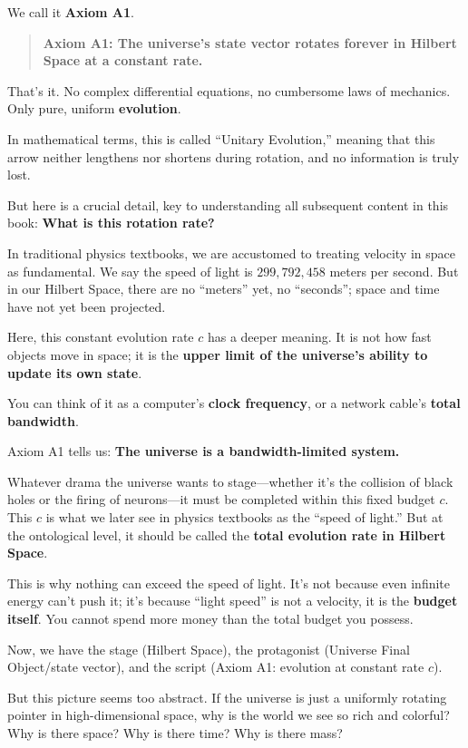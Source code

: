 We call it \textbf{Axiom A1}.

\begin{quote}
\textbf{Axiom A1: The universe's state vector rotates forever in Hilbert Space at a constant rate.}
\end{quote}

That's it. No complex differential equations, no cumbersome laws of mechanics. Only pure, uniform \textbf{evolution}.

In mathematical terms, this is called ``Unitary Evolution,'' meaning that this arrow neither lengthens nor shortens during rotation, and no information is truly lost.

But here is a crucial detail, key to understanding all subsequent content in this book: \textbf{What is this rotation rate?}

In traditional physics textbooks, we are accustomed to treating velocity in space as fundamental. We say the speed of light is $299,792,458$ meters per second. But in our Hilbert Space, there are no ``meters'' yet, no ``seconds''; space and time have not yet been projected.

Here, this constant evolution rate $c$ has a deeper meaning. It is not how fast objects move in space; it is the \textbf{upper limit of the universe's ability to update its own state}.

You can think of it as a computer's \textbf{clock frequency}, or a network cable's \textbf{total bandwidth}.

Axiom A1 tells us: \textbf{The universe is a bandwidth-limited system.}

Whatever drama the universe wants to stage---whether it's the collision of black holes or the firing of neurons---it must be completed within this fixed budget $c$. This $c$ is what we later see in physics textbooks as the ``speed of light.'' But at the ontological level, it should be called the \textbf{total evolution rate in Hilbert Space}.

This is why nothing can exceed the speed of light. It's not because even infinite energy can't push it; it's because ``light speed'' is not a velocity, it is the \textbf{budget itself}. You cannot spend more money than the total budget you possess.

Now, we have the stage (Hilbert Space), the protagonist (Universe Final Object/state vector), and the script (Axiom A1: evolution at constant rate $c$).

But this picture seems too abstract. If the universe is just a uniformly rotating pointer in high-dimensional space, why is the world we see so rich and colorful? Why is there space? Why is there time? Why is there mass?


